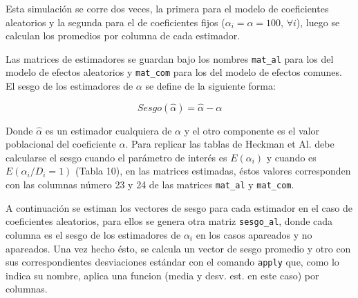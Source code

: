\documentclass[]{article}
\begin{document}
Esta simulación se corre dos veces, la primera para el modelo de
coeficientes aleatorios y la segunda para el de coeficientes fijos
($\alpha_{i}=\alpha=100$, $\forall i$), luego se calculan los promedios
por columna de cada estimador.

Las matrices de estimadores se guardan bajo los nombres \texttt{mat\_al}
para los del modelo de efectos aleatorios y \texttt{mat\_com} para los
del modelo de efectos comunes. El sesgo de los estimadores de $\alpha$
se define de la siguiente forma:

\[ Sesgo(\hat{\alpha})=\hat{\alpha}-\alpha \]

Donde $\hat{\alpha}$ es un estimador cualquiera de $\alpha$ y el otro
componente es el valor poblacional del coeficiente $\alpha$. Para
replicar las tablas de Heckman et Al. debe calcularse el sesgo cuando el
parámetro de interés es $E(\alpha_{i})$ y cuando es
$E(\alpha_{i}/D_{i}=1)$ (Tabla 10), en las matrices estimadas, éstos
valores corresponden con las columnas número 23 y 24 de las matrices
\texttt{mat\_al} y \texttt{mat\_com}.

A continuación se estiman los vectores de sesgo para cada estimador en
el caso de coeficientes aleatorios, para ellos se genera otra matriz
\texttt{sesgo\_al}, donde cada columna es el sesgo de los estimadores de
$\alpha_{i}$ en los casos apareados y no apareados. Una vez hecho ésto,
se calcula un vector de sesgo promedio y otro con sus correspondientes
desviaciones estándar con el comando \texttt{apply} que, como lo indica
su nombre, aplica una funcion (media y desv. est. en este caso) por
columnas.
\end{document}
